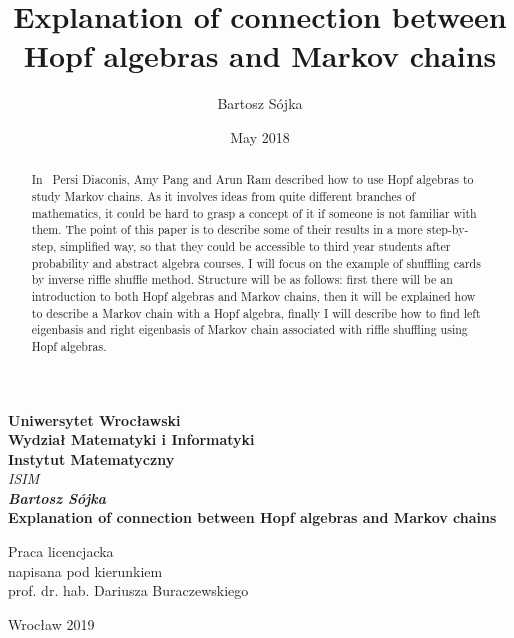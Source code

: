 \documentclass[a4paper, 12pt]{article}
\title{Explanation of connection between Hopf algebras and Markov chains}
\author{Bartosz Sójka}
\date{May 2018}
\begin{document}
\thispagestyle{empty}
\begin{center}
\textbf{\large Uniwersytet Wrocławski\\
Wydział Matematyki i Informatyki\\
Instytut Matematyczny}\\
\textit{\large ISIM}\\
\vspace{4cm}
\textbf{\textit{\large Bartosz Sójka}\\
\vspace{0.5cm}
{\Large Explanation of connection between Hopf algebras and Markov chains}}\\
\end{center}
\vspace{3cm}
{\large \hspace*{6.5cm}Praca licencjacka\\
\hspace*{6.5cm}napisana pod kierunkiem\\
\hspace*{6.5cm}prof. dr. hab. Dariusza Buraczewskiego }\\
\vfill
\begin{center}
{\large Wrocław 2019}\\
\end{center}
\newpage
\null
\thispagestyle{empty}
\newpage
\tableofcontents

\begin{abstract}

In~\cite{Diaconis2014} Persi Diaconis, Amy Pang and Arun Ram described how to use Hopf algebras to
study Markov chains. As it involves ideas from quite different branches of mathematics, it could be hard to
grasp a concept of it if someone is not familiar with them.
The point of this paper is to describe some of their results in a more step-by-step, simplified way,
so that they could be accessible to third year students after probability
and abstract algebra courses. I will focus on the example of shuffling cards by inverse riffle shuffle
method. Structure will be as follows: first there will be an introduction to both Hopf algebras and Markov
chains, then it will be explained how to describe a Markov chain with a Hopf algebra, finally I will
describe how to find left eigenbasis and right eigenbasis of Markov chain associated with riffle shuffling
using Hopf algebras.
\end{abstract}
\end{document}
